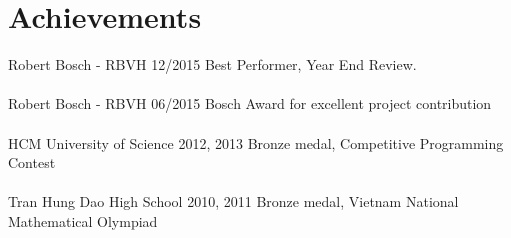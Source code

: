 \section*{Achievements}
{%
  \event
  {Robert Bosch - RBVH}
  {12/2015}
  {Best Performer, Year End Review.}
  \\
  \\
  \event
  {Robert Bosch - RBVH}
  {06/2015}
  {Bosch Award for excellent project contribution}
  \\
  \\
  \event
  {HCM University of Science}
  {2012, 2013}
  {Bronze medal, Competitive Programming Contest}
  \\
  \\
  \event
  {Tran Hung Dao High School}
  {2010, 2011}
  {Bronze medal, Vietnam National Mathematical Olympiad}
}%
